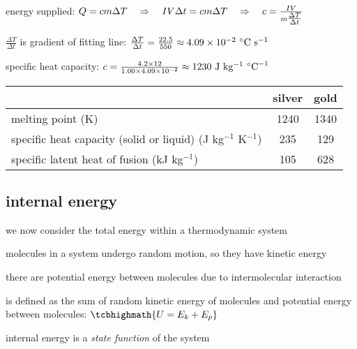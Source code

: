 \begin{soln} energy supplied: $Q = cm\Delta T \quad \Rightarrow \quad IV\Delta t = cm\Delta T \quad \Rightarrow \quad c = \frac{IV}{m \tfrac{\Delta T}{\Delta t}} $

$\frac{\Delta T}{\Delta t}$ is gradient of fitting line: $\frac{\Delta T}{\Delta t} = \frac{22.5}{550} \approx 4.09 \times 10^{-2} \text{ } \text{$^\circ\text{C}$} \text{ s}^{-1}$

specific heat capacity: $c = \frac{4.2\times12}{1.00 \times 4.09 \times 10^{-2}} \approx 1230 \text{ J kg$^{-1}$ $^\circ\text{C}^{-1}$}$	\end{soln}


\begin{center}
	\begin{tabular}{|l|c|c|}
		\hline  & silver & gold \\ 
		\hline melting point (K) & 1240 & 1340 \\ 
		\hline specific heat capacity (solid or liquid) (J kg$^{-1}$ K$^{-1}$) & 235 & 129 \\ 
		\hline specific latent heat of fusion (kJ kg$^{-1}$) & 105 & 628 \\
		\hline 
	\end{tabular} 
\end{center}



\subsection{internal energy}

we now consider the total energy within a thermodynamic system

molecules in a system undergo random motion, so they have kinetic energy

there are potential energy between molecules due to intermolecular interaction

\begin{ilight}
	 is defined as the sum of random kinetic energy of molecules and potential energy between molecules: $\tcbhighmath{U=E_k+E_p}$
\end{ilight}

\cmt internal energy is a \emph{state function} of the system

